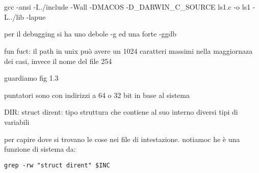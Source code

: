 
\section{}

 gcc -ansi -I../include -Wall -DMACOS -D_DARWIN_C_SOURCE  ls1.c -o ls1  -L../lib -lapue
 
 per il debugging si ha uno debole -g ed una forte -ggdb
 
 
 
 
 fun fuct: il path in unix può avere un 1024 caratteri massimi nella maggiornaza dei casi, invece il nome del file 254
 
 
 
 guardiamo fig 1.3
 

puntatori sono con indirizzi a 64 o 32 bit in base al sistema

DIR: 
struct dirent: tipo struttura che contiene al suo interno diversi tipi di variabili


per capire dove si trovano le cose nei file di intestazione. notiamoc he è una funzione di sistema da:
\begin{lstlisting}
grep -rw "struct dirent" $INC
\end{lstlisting}

